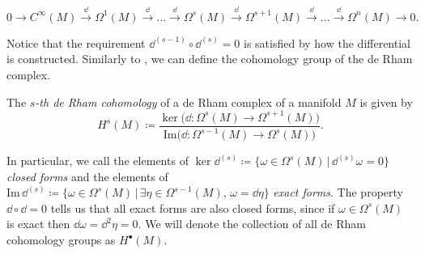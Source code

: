 \begin{equation*}
    0 \rightarrow C^\infty(M) \xrightarrow{\dd} \Omega^1(M)
    \xrightarrow{\dd} \ldots \xrightarrow{\dd} \Omega^s(M)
    \xrightarrow{\dd} \Omega^{s+1}(M) \xrightarrow{\dd} \ldots 
    \xrightarrow{\dd} \Omega^n(M)\rightarrow 0 .
\end{equation*}

Notice that the requirement $\! \dd^{(s-1)} \circ \dd^{(s)} = 0$ is satisfied by how the differential is constructed.
Similarly to , we can define the cohomology group of the de Rham complex.

\begin{definition}
    The \emph{$s$-th de Rham cohomology} of a de Rham complex of a manifold $M$ is given by
    \begin{equation*}
        H^s(M) \coloneqq \frac{\ker \Big( \dd : \Omega^s(M) \rightarrow \Omega^{s+1}(M)  \Big)}
        {\text{Im}\Big( \dd : \Omega^{s-1}(M) \rightarrow \Omega^{s}(M)  \Big)} .
    \end{equation*}
\end{definition}

In particular, we call the elements of $\ker \dd ^{(s)} \coloneqq \{ \omega \in \Omega^s(M) \, | \, \dd ^{(s)} \omega = 0\}$ \emph{closed forms} and the elements of $\text{Im} \, \dd ^{(s)} \coloneqq \{ \omega \in \Omega^s(M) \, | \, \exists \eta \in \Omega^{s-1}(M), \, \omega = \dd \eta \}$ \emph{exact forms}.
The property $\dd \circ \dd = 0$ tells us that all exact forms are also closed forms, since if $\omega \in \Omega^s(M)$ is exact then $\dd \omega = \dd ^2 \eta = 0$.
We will denote the collection of all de Rham cohomology groups as $H^\bullet(M)$.
